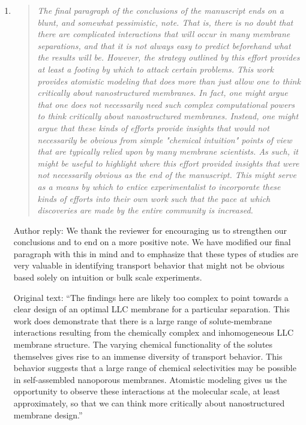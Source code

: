 \documentclass{article}
\begin{document}
\begin{enumerate}
    \item \begin{quote}
    \textit{The final paragraph of the conclusions of the manuscript ends on a blunt, and 
    somewhat pessimistic, note. That is, there is no doubt that there are complicated 
    interactions that will occur in many membrane separations, and that it is not always 
    easy to predict beforehand what the results will be. However, the strategy outlined 
    by this effort provides at least a footing by which to attack certain problems. This
    work provides atomistic modeling that does more than just allow one to think critically
    about nanostructured membranes. In fact, one might argue that one does not necessarily
    need such complex computational powers to think critically about nanostructured 
    membranes. Instead, one might argue that these kinds of efforts provide insights that
    would not necessarily be obvious from simple "chemical intuition" points of view that 
    are typically relied upon by many membrane scientists. As such, it might be useful to
    highlight where this effort provided insights that were not necessarily obvious as the
    end of the manuscript. This might serve as a means by which to entice experimentalist
    to incorporate these kinds of efforts into their own work such that the pace at which
    discoveries are made by the entire community is increased.}
    \end{quote}
	
    Author reply: We thank the reviewer for encouraging us to strengthen our conclusions and
    to end on a more positive note. We have modified our final paragraph with this in mind 
    and to emphasize that these types of studies are 
    very valuable in identifying
    transport behavior
    that might not be obvious based solely on intuition
    or bulk scale experiments.
    
    Original text: ``The findings here are likely too complex to point towards a clear 
    design of an optimal LLC membrane for a particular separation. This work does demonstrate
    that there is a large range of solute-membrane interactions resulting from the
    chemically complex and inhomogeneous LLC membrane structure. The varying chemical 
    functionality of the solutes themselves gives rise to an immense diversity of transport 
    behavior. This behavior suggests that a large range of chemical selectivities may be 
    possible in self-assembled nanoporous membranes. Atomistic modeling gives us the 
    opportunity to observe these interactions at the molecular scale, at least approximately,
    so that we can think more critically about nanostructured membrane design.''
    

\end{enumerate}
\end{document}
